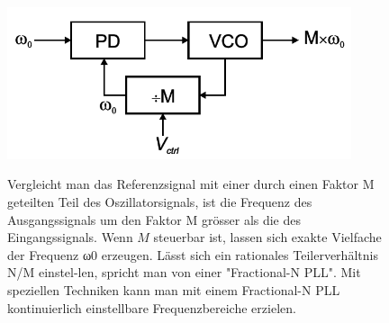 \begin{figure}[h!]
    \begin{minipage}{0.50\textwidth} 
       \includegraphics[width=0.9\textwidth]{images/Hohe_Frequ}\\
    \end{minipage}
    \begin{minipage}{0.4\textwidth}
      Vergleicht man das Referenzsignal mit einer durch einen Faktor M geteilten Teil des Oszillatorsignals, ist die Frequenz des Ausgangssignals um den Faktor M grösser als die des Eingangssignals. Wenn $M$ steuerbar ist, lassen sich exakte Vielfache der Frequenz ω0 erzeugen. Lässt sich ein rationales Teilerverhältnis N/M einstel-len, spricht man von einer "Fractional-N PLL". Mit speziellen Techniken kann man mit einem Fractional-N PLL kontinuierlich einstellbare Frequenzbereiche erzielen.
    \end{minipage}
\end{figure}

